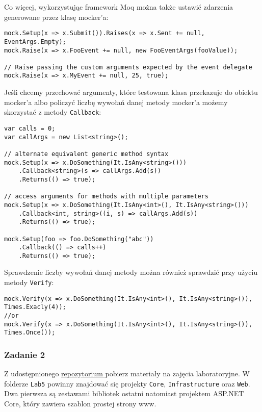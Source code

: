 Co więcej, wykorzystując framework Moq można także ustawić zdarzenia generowane przez klasę mocker'a:
\begin{lstlisting}
mock.Setup(x => x.Submit()).Raises(x => x.Sent += null, EventArgs.Empty);
mock.Raise(x => x.FooEvent += null, new FooEventArgs(fooValue));

// Raise passing the custom arguments expected by the event delegate
mock.Raise(x => x.MyEvent += null, 25, true);
\end{lstlisting}

Jeśli chcemy przechować argumenty, które testowana klasa przekazuje do obiektu mocker'a albo policzyć liczbę wywołań danej metody mocker'a możemy skorzystać z metody \texttt{Callback}:
\begin{lstlisting}
var calls = 0;
var callArgs = new List<string>();

// alternate equivalent generic method syntax
mock.Setup(x => x.DoSomething(It.IsAny<string>()))
	.Callback<string>(s => callArgs.Add(s))
	.Returns(() => true);

// access arguments for methods with multiple parameters
mock.Setup(x => x.DoSomething(It.IsAny<int>(), It.IsAny<string>()))
	.Callback<int, string>((i, s) => callArgs.Add(s))
	.Returns(() => true);

mock.Setup(foo => foo.DoSomething("abc"))
	.Callback(() => calls++)
	.Returns(() => true);
\end{lstlisting}

Sprawdzenie liczby wywołań danej metody można również sprawdzić przy użyciu metody \texttt{Verify}:
\begin{lstlisting}
mock.Verify(x => x.DoSomething(It.IsAny<int>(), It.IsAny<string>()), Times.Exacly(4));
//or
mock.Verify(x => x.DoSomething(It.IsAny<int>(), It.IsAny<string>()), Times.Once());
\end{lstlisting}

\subsubsection{Zadanie 2}
Z udostępnionego \href{https://gitlab.com/PierreSimonDeLaplace/wsb-zaawansowane-techniki-obiektowe-sources}{repozytorium } pobierz materiały na zajęcia laboratoryjne. W folderze \texttt{Lab5} powinny znajdować się projekty \texttt{Core}, \texttt{Infrastructure} oraz \texttt{Web}. Dwa pierwsza są zestawami bibliotek ostatni natomiast projektem ASP.NET Core, który zawiera szablon prostej strony www.

